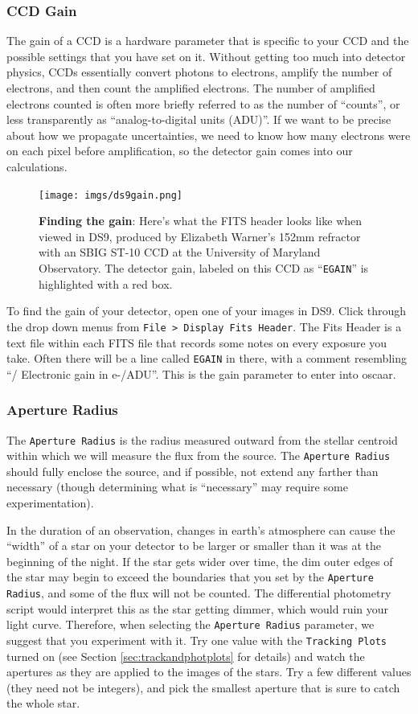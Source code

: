 \documentclass[a4paper]{article}
\newcommand{\code}[1]{\texttt{#1}}
\begin{document}
\subsubsection{CCD Gain}
The gain of a CCD is a hardware parameter that is specific to your CCD and the possible settings that you have set on it. Without getting too much into detector physics, CCDs essentially convert photons to electrons, amplify the number of electrons, and then count the amplified electrons. The number of amplified electrons counted is often more briefly referred to as the number of ``counts'', or less transparently as ``analog-to-digital units (ADU)''. If we want to be precise about how we propagate uncertainties, we need to know how many electrons were on each pixel before amplification, so the detector gain comes into our calculations. 
\begin{figure}[H]
\begin{center}
\texttt{[image: imgs/ds9gain.png]}
\caption{\textbf{Finding the gain}: Here's what the FITS header looks like when viewed in DS9, produced by Elizabeth Warner's 152mm refractor with an SBIG ST-10 CCD at the University of Maryland Observatory. The detector gain, labeled on this CCD as ``\code{EGAIN}'' is highlighted with a red box.}
\label{fig:ccdGain}
\end{center}	
\end{figure}
To find the gain of your detector, open one of your images in DS9. Click through the drop down menus from \code{File > Display Fits Header}. The Fits Header is a text file within each FITS file that records some notes on every exposure you take. Often there will be a line called \code{EGAIN} in there, with a comment resembling ``/ Electronic gain in e-/ADU''. This is the gain parameter to enter into oscaar. 

\subsubsection{Aperture Radius} \label{sec:aperRad}
The \code{Aperture Radius} is the radius measured outward from the stellar centroid within which we will measure the flux from the source. The \code{Aperture Radius} should fully enclose the source, and if possible, not extend any farther than necessary (though determining what is ``necessary'' may require some experimentation). 

In the duration of an observation, changes in earth's atmosphere can cause the ``width'' of a star on your detector to be larger or smaller than it was at the beginning of the night. If the star gets wider over time, the dim outer edges of the star may begin to exceed the boundaries that you set by the \code{Aperture Radius}, and some of the flux will not be counted. The differential photometry script would interpret this as the star getting dimmer, which would ruin your light curve. Therefore, when selecting the \code{Aperture Radius} parameter, we suggest that you experiment with it. Try one value with the \code{Tracking Plots} turned on (see Section \ref{sec:trackandphotplots} for details) and watch the apertures as they are applied to the images of the stars. Try a few different values (they need not be integers), and pick the smallest aperture that is sure to catch the whole star. 
\end{document}
